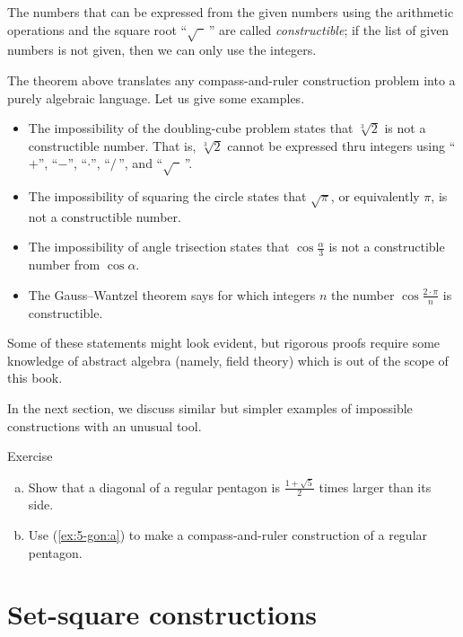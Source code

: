 The numbers that can be expressed from the given numbers using the arithmetic operations and the square root ``$\sqrt{\phantom{a}}\,$'' are called \emph{constructible};
if the list of given numbers is not given, then we can only use the integers.

{\sloppy
The theorem above translates any compass-and-ruler construction problem into a purely algebraic language.
Let us give some examples.
\begin{itemize}
\item The impossibility of the doubling-cube problem states that $\sqrt[3]{2}$ is not a constructible number.
That is, $\sqrt[3]{2}$ cannot be expressed thru integers using
``$+$'', ``$-$'', ``$\cdot$'', ``$/\,$'', and ``$\sqrt{\phantom{a}}\,$''.

\item The impossibility of squaring the circle states that 
$\sqrt{\pi}$, or equivalently $\pi$, is not a constructible number.

\item The impossibility of angle trisection states that $\cos\tfrac\alpha3$ is not a constructible number from $\cos\alpha$.

\item The Gauss--Wantzel theorem says for which integers $n$ the number 
$\cos\tfrac{2\cdot\pi}n$ is constructible.
\end{itemize} 
Some of these statements might look evident, 
but rigorous proofs require some knowledge of abstract algebra (namely, field theory)
which is out of the scope of this book. 

}

In the next section, we discuss similar but simpler examples of impossible constructions with an unusual tool.

\begin{thm}{Exercise}\label{ex:5-gon}
\begin{enumerate}[(a)]
 \item\label{ex:5-gon:a} Show that a diagonal of a regular pentagon is $\tfrac{1+\sqrt5}2$ times larger than its side.
 \item\label{ex:5-gon:b} Use (\ref{ex:5-gon:a}) to make a compass-and-ruler construction of a regular pentagon.
\end{enumerate}
\end{thm}

\section{Set-square constructions}

